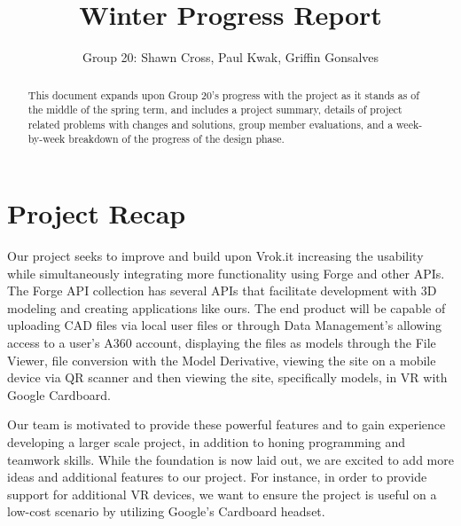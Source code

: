 \documentclass[10pt,draftclsnofoot,onecolumn]{IEEEtran}
\begin{document}
\title{Winter Progress Report}
\author{Group 20: Shawn Cross, Paul Kwak, Griffin Gonsalves}
\maketitle
\hspace*{\fill}\hspace*{\fill}
\vspace{2cm}
\begin{abstract}
This document expands upon Group 20's progress with the project as it stands as of the middle of the spring term, and includes a project summary, details of project related problems with changes and solutions, group member evaluations, and a week-by-week breakdown of the progress of the design phase. 
\end{abstract}
\IEEEpeerreviewmaketitle

\newpage
{}

\section{Project Recap}
Our project seeks to improve and build upon Vrok.it increasing the usability while simultaneously integrating more functionality using Forge and other APIs. The Forge API collection has several APIs that facilitate development with 3D modeling and creating applications like ours. The end product will be capable of uploading CAD files via local user files or through Data Management’s allowing access to a user’s A360 account, displaying the files as models through the File Viewer, file conversion with the Model Derivative, viewing the site on a mobile device via QR scanner and then viewing the site, specifically models, in VR with Google Cardboard.

Our team is motivated to provide these powerful features and to gain experience developing a larger scale project, in addition to honing programming and teamwork skills. While the foundation is now laid out, we are excited to add more ideas and additional features to our project. For instance, in order to provide support for additional VR devices, we want to ensure the project is useful on a low-cost scenario by utilizing Google's Cardboard headset.
\end{document}
